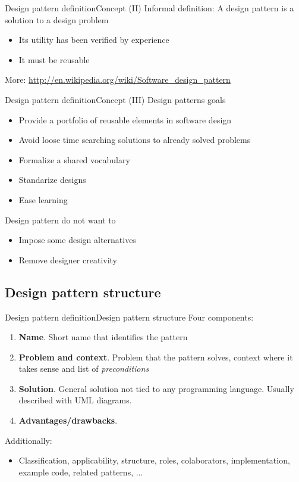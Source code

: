 \documentclass[10pt,compress]{beamer} %
\begin{document}
\begin{frame}{Design pattern definition}{Concept (II)}
		Informal definition: A design pattern is a solution to a design problem
			\begin{itemize}
			\item Its utility has been verified by experience
			\item It must be reusable
			\end{itemize}	
	\centering\scriptsize{More: \url{http://en.wikipedia.org/wiki/Software\_design\_pattern}}
\end{frame}

\begin{frame}{Design pattern definition}{Concept (III)}
	Design patterns goals
	\begin{itemize}
		\item Provide a portfolio of reusable elements in software design
		\item Avoid loose time searching solutions to already solved problems
		\item Formalize a shared vocabulary
		\item Standarize designs
		\item Ease learning
 	\end{itemize}
	Design pattern do not want to
	\begin{itemize}
		\item Impose some design alternatives
		\item Remove designer creativity
	\end{itemize}
\end{frame}

\subsection[Design pattern structure]{Design pattern structure}
\begin{frame}{Design pattern definition}{Design pattern structure}
	Four components:
	\begin{enumerate}
		\item \textbf{Name}. Short name that identifies the pattern
		\item \textbf{Problem and context}. Problem that the pattern solves, context where it takes sense and list of \textit{preconditions}
		\item \textbf{Solution}. General solution not tied to any programming language. Usually described with UML diagrams.
		\item \textbf{Advantages/drawbacks}.
	\end{enumerate}
	Additionally:
	\begin{itemize}
		\item Classification, applicability, structure, roles, colaborators, implementation, example code, related patterns, ...
	\end{itemize}
\end{frame}
\end{document}
